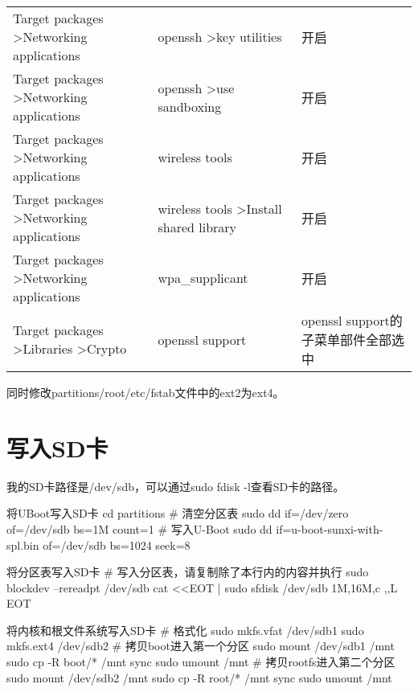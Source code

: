 \documentclass[lang=cn,newtx,10pt,scheme=chinese]{elegantbook}
\begin{document}
\begin{table}[ht]
\begin{adjustbox}{width=1\textwidth}
\begin{tabular}{|l|l|l|}
Target packages \textgreater Networking applications       & openssh \textgreater key utilities                 & 开启                        \\
Target packages \textgreater Networking applications       & openssh \textgreater use sandboxing                & 开启                        \\
Target packages \textgreater Networking applications       & wireless tools                                     & 开启                        \\
Target packages \textgreater Networking applications       & wireless tools \textgreater Install shared library & 开启                        \\
Target packages \textgreater Networking applications       & wpa\_supplicant                                    & 开启                        \\
Target packages \textgreater Libraries \textgreater Crypto & openssl support                                    & openssl support的子菜单部件全部选中 \\
\hline
\end{tabular}
\end{adjustbox}
\end{table}

同时修改partitions/root/etc/fstab文件中的ext2为ext4。

\section{写入SD卡}

我的SD卡路径是/dev/sdb，可以通过sudo fdisk -l查看SD卡的路径。

\begin{mycode}{将UBoot写入SD卡}
cd partitions
# 清空分区表
sudo dd if=/dev/zero of=/dev/sdb bs=1M count=1
# 写入U-Boot
sudo dd if=u-boot-sunxi-with-spl.bin of=/dev/sdb bs=1024 seek=8
\end{mycode}

\begin{mycode}{将分区表写入SD卡}
# 写入分区表，请复制除了本行内的内容并执行
sudo blockdev --rereadpt /dev/sdb
cat <<EOT | sudo sfdisk /dev/sdb
1M,16M,c
,,L
EOT
\end{mycode}

\begin{mycode}{将内核和根文件系统写入SD卡}
# 格式化
sudo mkfs.vfat /dev/sdb1
sudo mkfs.ext4 /dev/sdb2
# 拷贝boot进入第一个分区
sudo mount /dev/sdb1 /mnt
sudo cp -R boot/* /mnt
sync
sudo umount /mnt
# 拷贝rootfs进入第二个分区
sudo mount /dev/sdb2 /mnt
sudo cp -R root/* /mnt
sync
sudo umount /mnt
\end{mycode}
\end{document}
